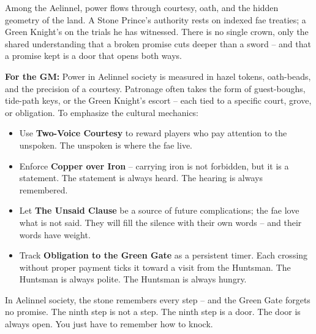 \begin{tcolorbox}[colback=black!3,colframe=black!40!white,title={Patronage \& Power},breakable]
Among the Aelinnel, power flows through courtesy, oath, and the hidden geometry of the land. A Stone Prince's authority rests on indexed fae treaties; a Green Knight's on the trials he has witnessed. There is no single crown, only the shared understanding that a broken promise cuts deeper than a sword -- and that a promise kept is a door that opens both ways.

\textbf{For the GM:}  
Power in Aelinnel society is measured in hazel tokens, oath-beads, and the precision of a courtesy. Patronage often takes the form of guest-boughs, tide-path keys, or the Green Knight's escort -- each tied to a specific court, grove, or obligation. To emphasize the cultural mechanics:
\begin{itemize}
\item Use \textbf{Two-Voice Courtesy} to reward players who pay attention to the unspoken. The unspoken is where the fae live.
\item Enforce \textbf{Copper over Iron} -- carrying iron is not forbidden, but it is a statement. The statement is always heard. The hearing is always remembered.
\item Let \textbf{The Unsaid Clause} be a source of future complications; the fae love what is not said. They will fill the silence with their own words -- and their words have weight.
\item Track \textbf{Obligation to the Green Gate} as a persistent timer. Each crossing without proper payment ticks it toward a visit from the Huntsman. The Huntsman is always polite. The Huntsman is always hungry.
\end{itemize}
In Aelinnel society, the stone remembers every step -- and the Green Gate forgets no promise. The ninth step is not a step. The ninth step is a door. The door is always open. You just have to remember how to knock.
\end{tcolorbox}

